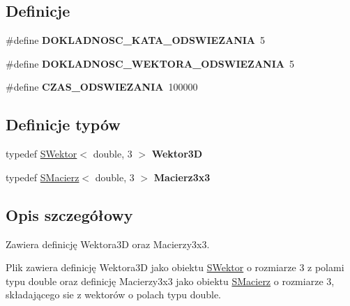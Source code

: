 \subsection*{Definicje}
\begin{DoxyCompactItemize}
\item 
\mbox{\label{typy__danych_8hh_a041a8dbff2d4eb4e4e7134a5f54406bf}} 
\#define {\bfseries D\+O\+K\+L\+A\+D\+N\+O\+S\+C\+\_\+\+K\+A\+T\+A\+\_\+\+O\+D\+S\+W\+I\+E\+Z\+A\+N\+IA}~5
\item 
\mbox{\label{typy__danych_8hh_a7f04bfdda9721d265bbb0d8063182abd}} 
\#define {\bfseries D\+O\+K\+L\+A\+D\+N\+O\+S\+C\+\_\+\+W\+E\+K\+T\+O\+R\+A\+\_\+\+O\+D\+S\+W\+I\+E\+Z\+A\+N\+IA}~5
\item 
\mbox{\label{typy__danych_8hh_ac1623702b1fe474063b70d6fcd890184}} 
\#define {\bfseries C\+Z\+A\+S\+\_\+\+O\+D\+S\+W\+I\+E\+Z\+A\+N\+IA}~100000
\end{DoxyCompactItemize}
\subsection*{Definicje typów}
\begin{DoxyCompactItemize}
\item 
\mbox{\label{typy__danych_8hh_a97a30d7257f40ddd7ba8726d98ba5c8b}} 
typedef \hyperlink{classSWektor}{S\+Wektor}$<$ double, 3 $>$ {\bfseries Wektor3D}
\item 
\mbox{\label{typy__danych_8hh_a8cb75ecee4b1f371170039dfe2ec4aa2}} 
typedef \hyperlink{classSMacierz}{S\+Macierz}$<$ double, 3 $>$ {\bfseries Macierz3x3}
\end{DoxyCompactItemize}


\subsection{Opis szczegółowy}
Zawiera definicję Wektora3D oraz Macierzy3x3. 

Plik zawiera definicję Wektora3D jako obiektu \hyperlink{classSWektor}{S\+Wektor} o rozmiarze 3 z polami typu double oraz definicję Macierzy3x3 jako obiektu \hyperlink{classSMacierz}{S\+Macierz} o rozmiarze 3, składającego sie z wektorów o polach typu double. 